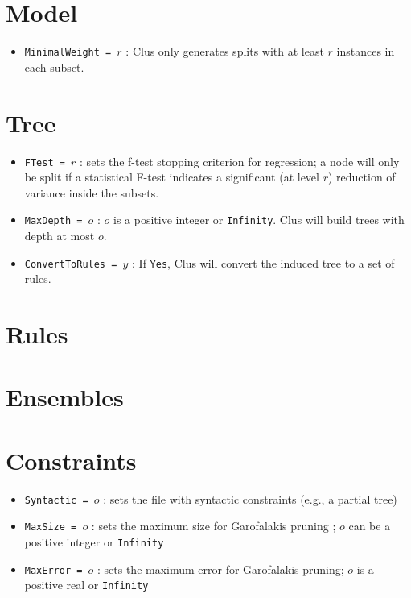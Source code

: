 \documentclass[a4paper]{report}
\begin{document}
\section{Model}

\begin{itemize}
\item {\tt MinimalWeight = $r$} : Clus only generates splits with at least $r$ instances in each subset.
\end{itemize}

\section{Tree}

\begin{itemize}
\item {\tt FTest = $r$} : sets the f-test stopping criterion for regression; a node will only be split if a statistical F-test indicates a significant (at level $r$) reduction of variance inside the subsets.
\item {\tt MaxDepth = $o$} : $o$ is a positive integer or {\tt Infinity}.  Clus will build trees with depth at  most $o$.
\item {\tt ConvertToRules = $y$} : If {\tt Yes},  Clus will convert the induced tree to a set of rules.
\end{itemize}

\section{Rules}


\section{Ensembles}

\section{Constraints}

\begin{itemize}
\item {\tt Syntactic = $o$} : sets the file with syntactic constraints (e.g., a partial tree) \cite{Struyf06-KDID:proc}
\item {\tt MaxSize = $o$} : sets the maximum size for Garofalakis pruning \cite{Garofalakis03:jrnl, Struyf06-KDID:proc}; $o$ can be a positive integer or {\tt Infinity}
\item {\tt MaxError = $o$} : sets the maximum error for Garofalakis pruning; $o$ is a positive real or {\tt Infinity}
\end{itemize}
\end{document}
